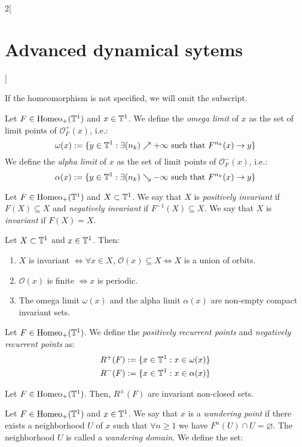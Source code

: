 \documentclass[../../../main_math.tex]{subfiles}
\begin{document}
\begin{multicols}{2}[\section{Advanced dynamical sytems}]
\begin{definition}
    If the homeomorphism is not specified, we will omit the subscript.
  \end{definition}
  \begin{definition}
    Let $F\in\mathrm{Homeo}_+(\mathbb{T}^1)$ and $x\in \mathbb{T}^1$. We define the \emph{omega limit} of $x$ as the set of limit points of $\mathcal{O}_F^+(x)$, i.e.:
    $$
      \omega(x):=\{y\in\mathbb{T}^1:\exists (n_k)\nearrow+\infty\text{ such that }F^{n_k}(x)\to y\}
    $$
    We define the \emph{alpha limit} of $x$ as the set of limit points of $\mathcal{O}_F^-(x)$, i.e.:
    $$
      \alpha(x):=\{y\in\mathbb{T}^1:\exists (n_k)\searrow-\infty\text{ such that }F^{n_k}(x)\to y\}
    $$
  \end{definition}
  \begin{definition}
    Let $F\in\mathrm{Homeo}_+(\mathbb{T}^1)$ and $X\subset \mathbb{T}^1$. We say that $X$ is \emph{positively invariant} if $F(X)\subseteq X$ and \emph{negatively invariant} if $F^{-1}(X)\subseteq X$. We say that $X$ is \emph{invariant} if $F(X)=X$.
  \end{definition}
  \begin{proposition}
    Let $X\subset \mathbb{T}^1$ and $x\in \mathbb{T}^1$. Then:
    \begin{enumerate}
      \item $X$ is invariant $\iff \forall x\in X$, $\mathcal{O}(x)\subseteq X\iff X$ is a union of orbits.
      \item $\mathcal{O}(x)$ is finite $\iff x$ is periodic.
      \item The omega limit $\omega(x)$ and the alpha limit $\alpha(x)$ are non-empty compact invariant sets.
    \end{enumerate}
  \end{proposition}
  \begin{definition}
    Let $F\in \mathrm{Homeo}_+(\mathbb{T}^1)$. We define the \emph{positively recurrent points} and \emph{negatively recurrent points} as:
    \begin{align*}
      R^+(F):=\{x\in\mathbb{T}^1:x\in\omega(x)\} \\
      R^-(F):=\{x\in\mathbb{T}^1:x\in\alpha(x)\}
    \end{align*}
  \end{definition}
  \begin{proposition}
    Let $F\in \mathrm{Homeo}_+(\mathbb{T}^1)$. Then, $R^\pm(F)$ are invariant non-closed sets.
  \end{proposition}
  \begin{definition}
    Let $F\in \mathrm{Homeo}_+(\mathbb{T}^1)$ and $x\in \mathbb{T}^1$. We say that $x$ is a \emph{wandering point} if there exists a neighborhood $U$ of $x$ such that $\forall n\geq 1$ we have $F^n(U)\cap U=\varnothing$. The neighborhood $U$ is called a \emph{wandering domain}. We define the set:

\end{definition}
\end{multicols}
\end{document}
